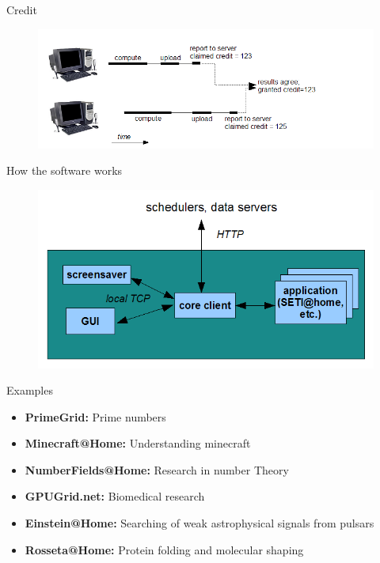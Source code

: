 \documentclass{beamer}
\begin{document}
%
\begin{frame}{Credit}
\begin{figure}
  \includegraphics[width=\linewidth]{credit.png}
\end{figure}
\end{frame}
%
\begin{frame}{How the software works}
\begin{figure}
  \includegraphics[width=\linewidth]{client.png}
\end{figure}
\end{frame}
\begin{frame}{Examples}
\begin{itemize}
\item \textbf{PrimeGrid:} Prime numbers
\item \textbf{Minecraft@Home:} Understanding minecraft
\item \textbf{NumberFields@Home:} Research in number Theory
\item \textbf{GPUGrid.net:} Biomedical research
\item \textbf{Einstein@Home:} Searching of weak astrophysical signals from pulsars
\item \textbf{Rosseta@Home:} Protein folding and molecular shaping
\end{itemize}
\end{frame}
%
\end{document}
